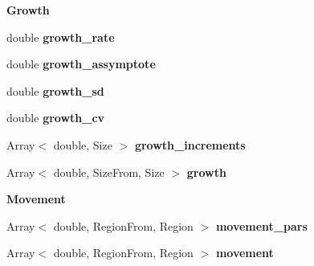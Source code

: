 \begin{Indent}{\bf Growth}\par
\begin{DoxyCompactItemize}
\item 
\hypertarget{classIOSKJ_1_1Model_a37a3bf07009aa97913f40e58110e8bdf}{double {\bfseries growth\-\_\-rate}}\label{classIOSKJ_1_1Model_a37a3bf07009aa97913f40e58110e8bdf}

\item 
\hypertarget{classIOSKJ_1_1Model_a02f4a83466509247a77ecec82980aa5b}{double {\bfseries growth\-\_\-assymptote}}\label{classIOSKJ_1_1Model_a02f4a83466509247a77ecec82980aa5b}

\item 
\hypertarget{classIOSKJ_1_1Model_ac4a5b947f4c8f00a43d40dde17374222}{double {\bfseries growth\-\_\-sd}}\label{classIOSKJ_1_1Model_ac4a5b947f4c8f00a43d40dde17374222}

\item 
\hypertarget{classIOSKJ_1_1Model_a52e9d3dbf85db8de068b3843c7769ef7}{double {\bfseries growth\-\_\-cv}}\label{classIOSKJ_1_1Model_a52e9d3dbf85db8de068b3843c7769ef7}

\item 
\hypertarget{classIOSKJ_1_1Model_ae56a1109058ca37a7bb05f62ceac6d06}{Array$<$ double, Size $>$ {\bfseries growth\-\_\-increments}}\label{classIOSKJ_1_1Model_ae56a1109058ca37a7bb05f62ceac6d06}

\item 
\hypertarget{classIOSKJ_1_1Model_aa08429f500442de8a2e93bf00b20e0e9}{Array$<$ double, Size\-From, Size $>$ {\bfseries growth}}\label{classIOSKJ_1_1Model_aa08429f500442de8a2e93bf00b20e0e9}

\end{DoxyCompactItemize}
\end{Indent}
\begin{Indent}{\bf Movement}\par
\begin{DoxyCompactItemize}
\item 
\hypertarget{classIOSKJ_1_1Model_a035849bda5a75ef50d5d83ce93462fb4}{Array$<$ double, Region\-From, Region $>$ {\bfseries movement\-\_\-pars}}\label{classIOSKJ_1_1Model_a035849bda5a75ef50d5d83ce93462fb4}

\item 
\hypertarget{classIOSKJ_1_1Model_ac09e002c91144697de6e96bb8beb6d83}{Array$<$ double, Region\-From, Region $>$ {\bfseries movement}}\label{classIOSKJ_1_1Model_ac09e002c91144697de6e96bb8beb6d83}

\end{DoxyCompactItemize}
\end{Indent}
